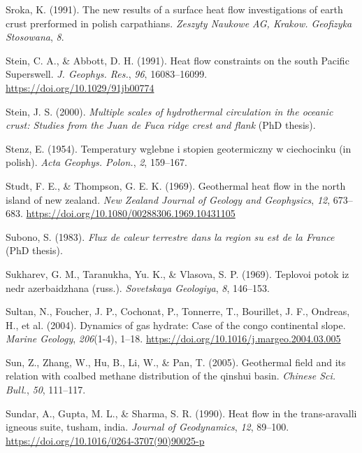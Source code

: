 \begin{CSLReferences}{1}{1}
\leavevmode{}%
Sroka, K. (1991). The new results of a surface heat flow investigations of earth crust prerformed in polish carpathians. \emph{Zeszyty Naukowe AG, Krakow. Geofizyka Stosowana}, \emph{8}.

\leavevmode{}%
Stein, C. A., \& Abbott, D. H. (1991). Heat flow constraints on the south {Pacific Superswell}. \emph{J. Geophys. Res.}, \emph{96}, 16083--16099. \url{https://doi.org/10.1029/91jb00774}

\leavevmode{}%
Stein, J. S. (2000). \emph{Multiple scales of hydrothermal circulation in the oceanic crust: Studies from the {Juan de Fuca} ridge crest and flank} (PhD thesis).

\leavevmode{}%
Stenz, E. (1954). Temperatury wglebne i stopien geotermiczny w ciechocinku (in polish). \emph{Acta Geophys. Polon.}, \emph{2}, 159--167.

\leavevmode{}%
Studt, F. E., \& Thompson, G. E. K. (1969). Geothermal heat flow in the north island of new zealand. \emph{New Zealand Journal of Geology and Geophysics}, \emph{12}, 673--683. \url{https://doi.org/10.1080/00288306.1969.10431105}

\leavevmode{}%
Subono, S. (1983). \emph{Flux de caleur terrestre dans la region su est de la {France}} (PhD thesis).

\leavevmode{}%
Sukharev, G. M., Taranukha, Yu. K., \& Vlasova, S. P. (1969). Teplovoi potok iz nedr azerbaidzhana (russ.). \emph{Sovetskaya Geologiya}, \emph{8}, 146--153.

\leavevmode{}%
Sultan, N., Foucher, J. P., Cochonat, P., Tonnerre, T., Bourillet, J. F., Ondreas, H., et al. (2004). Dynamics of gas hydrate: Case of the congo continental slope. \emph{Marine Geology}, \emph{206}(1-4), 1--18. \url{https://doi.org/10.1016/j.margeo.2004.03.005}

\leavevmode{}%
Sun, Z., Zhang, W., Hu, B., Li, W., \& Pan, T. (2005). Geothermal field and its relation with coalbed methane distribution of the qinshui basin. \emph{Chinese Sci. Bull.}, \emph{50}, 111--117.

\leavevmode{}%
Sundar, A., Gupta, M. L., \& Sharma, S. R. (1990). Heat flow in the trans-aravalli igneous suite, tusham, india. \emph{Journal of Geodynamics}, \emph{12}, 89--100. \url{https://doi.org/10.1016/0264-3707(90)90025-p}


\end{CSLReferences}
